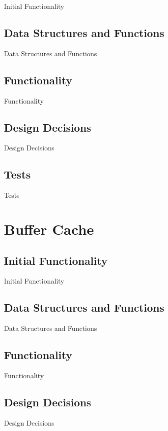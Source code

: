 Initial Functionality
  

\subsection{Data Structures and Functions}
  
Data Structures and Functions

\subsection{Functionality}
  
Functionality

\subsection{Design Decisions}
  
Design Decisions

\subsection{Tests}

Tests

\section{Buffer Cache}
\subsection{Initial Functionality}

Initial Functionality
  

\subsection{Data Structures and Functions}
  
Data Structures and Functions

\subsection{Functionality}
  
Functionality

\subsection{Design Decisions}
  
Design Decisions

